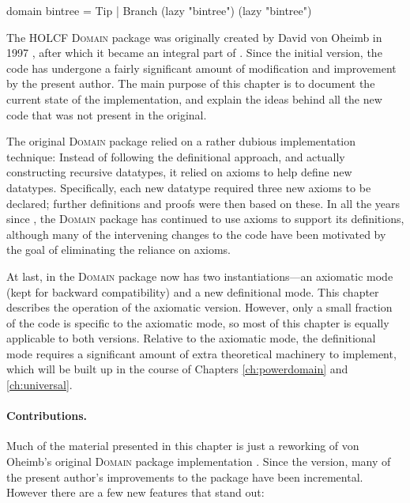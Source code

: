 \begin{isacode}
domain bintree = Tip | Branch (lazy "bintree") (lazy "bintree")
\end{isacode}

The HOLCF \textsc{Domain} package was originally created by David von Oheimb in 1997 \cite{Oheimb97}, after which it became an integral part of  \cite{hol+lcf}. Since the initial version, the code has undergone a fairly significant amount of modification and improvement by the present author. The main purpose of this chapter is to document the current state of the implementation, and explain the ideas behind all the new code that was not present in the original.

The original \textsc{Domain} package relied on a rather dubious implementation technique: Instead of following the definitional approach, and actually constructing recursive datatypes, it relied on axioms to help define new datatypes. Specifically, each new datatype required three new axioms to be declared; further definitions and proofs were then based on these. In all the years since , the \textsc{Domain} package has continued to use axioms to support its definitions, although many of the intervening changes to the code have been motivated by the goal of eliminating the reliance on axioms.

At last, in  the \textsc{Domain} package now has two instantiations---an axiomatic mode (kept for backward compatibility) and a new definitional mode. This chapter describes the operation of the axiomatic version. However, only a small fraction of the code is specific to the axiomatic mode, so most of this chapter is equally applicable to both versions. Relative to the axiomatic mode, the definitional mode requires a significant amount of extra theoretical machinery to implement, which will be built up in the course of Chapters \ref{ch:powerdomain} and \ref{ch:universal}.

\paragraph{Contributions.}

Much of the material presented in this chapter is just a reworking of von Oheimb's original \textsc{Domain} package implementation \cite{Oheimb97}. Since the  version, many of the present author's improvements to the package have been incremental. However there are a few new features that stand out:

